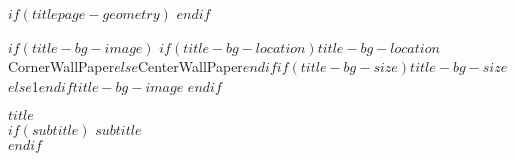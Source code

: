 


$if(titlepage-geometry)$
$endif$


$if(title-bg-image)$
  \This$if(title-bg-location)$$title-bg-location$CornerWallPaper$else$CenterWallPaper$endif${$if(title-bg-size)$$title-bg-size$$else$1$endif$}{$title-bg-image$}  
$endif$

\begin{tcolorbox}


\centering

{\headingfont\Huge\bfseries\nohyphens{$title$}}\\[1\baselineskip]
$if(subtitle)$
  {\huge{$subtitle$}}\\[4\baselineskip]
$endif$

\end{tcolorbox}

\bigbreak

